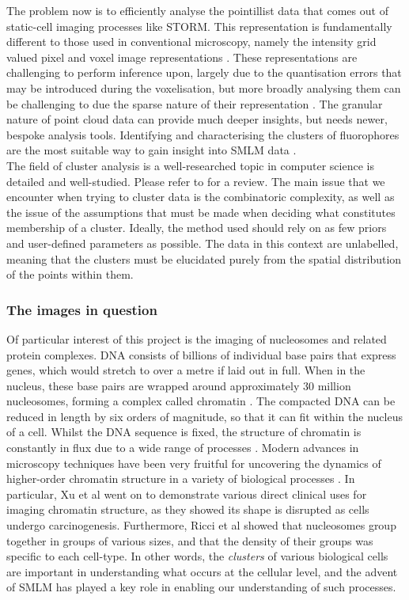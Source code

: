 \documentclass[11pt]{article}
\begin{document}
The problem now is to efficiently analyse the pointillist data that comes out of static-cell imaging processes like STORM. This representation is fundamentally different to those used in conventional microscopy, namely the intensity grid valued pixel and voxel image representations \cite{Khater2020}. These representations are challenging to perform inference upon, largely due to the quantisation errors that may be introduced during the voxelisation, but more broadly analysing them can be challenging to due the sparse nature of their representation \cite{s21165574,s21248241}. The granular nature of point cloud data can provide much deeper insights, but needs newer, bespoke analysis tools. Identifying and characterising the clusters of fluorophores are the most suitable way to gain insight into SMLM data \cite{Khater2020}. \\

The field of cluster analysis is a well-researched topic in computer science is detailed and well-studied. Please refer to \cite{jain1999data} for a review. The main issue that we encounter when trying to cluster data is the combinatoric complexity, as well as the issue of the assumptions that must be made when deciding what constitutes membership of a cluster. Ideally, the method used should rely on as few priors and user-defined parameters as possible. The data in this context are unlabelled, meaning that the clusters must be elucidated purely from the spatial distribution of the points within them.

\subsubsection{The images in question}
Of particular interest of this project is the imaging of nucleosomes and related protein complexes. DNA consists of billions of individual base pairs that express genes, which would stretch to over a metre if laid out in full. When in the nucleus, these base pairs are wrapped around approximately 30 million nucleosomes, forming a complex called chromatin \cite{xu2019guide, flavahan2017epigenetic}. The compacted DNA can be reduced in length by six orders of magnitude, so that it can fit within the nucleus of a cell. Whilst the DNA sequence is fixed, the structure of chromatin is constantly in flux due to a wide range of processes \cite{xu2019guide}. Modern advances in microscopy techniques have been very fruitful for uncovering the dynamics of higher-order chromatin structure in a variety of biological processes \cite{xu2019guide}. In particular, Xu et al \cite{xu2022ultrastructural} went on to demonstrate various direct clinical uses for imaging chromatin structure, as they showed its shape is disrupted as cells undergo carcinogenesis. 
Furthermore, Ricci et al \cite{ricci2015chromatin} showed that nucleosomes group together in groups of various sizes, and that the density of their groups was specific to each cell-type. In other words, the \textit{clusters} of various biological cells are important in understanding what occurs at the cellular level, and the advent of SMLM has played a key role in enabling our understanding of such processes.
\end{document}
